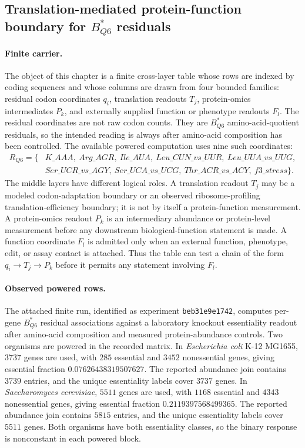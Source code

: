 \subsection{Translation-mediated protein-function boundary for $B^{*}_{Q6}$ residuals}
\label{subsec:q6-translation-mediated-protein-function-boundary-cross-layer}

\paragraph{Finite carrier.}
The object of this chapter is a finite cross-layer table whose rows are indexed by coding sequences and whose columns are drawn from four bounded families: residual codon coordinates $q_i$, translation readouts $T_j$, protein-omics intermediates $P_k$, and externally supplied function or phenotype readouts $F_l$.  The residual coordinates are not raw codon counts.  They are $B^{*}_{Q6}$ amino-acid-quotient residuals, so the intended reading is always after amino-acid composition has been controlled.  The available powered computation uses nine such coordinates:
$$
\begin{aligned}
R_{Q6}=\{&K\_AAA,\ Arg\_AGR,\ Ile\_AUA,\ Leu\_CUN\_vs\_UUR,\ Leu\_UUA\_vs\_UUG,\\
&Ser\_UCR\_vs\_AGY,\ Ser\_UCA\_vs\_UCG,\ Thr\_ACR\_vs\_ACY,\ f3\_stress\}.
\end{aligned}
$$
The middle layers have different logical roles.  A translation readout $T_j$ may be a modeled codon-adaptation boundary or an observed ribosome-profiling translation-efficiency boundary; it is not by itself a protein-function measurement.  A protein-omics readout $P_k$ is an intermediary abundance or protein-level measurement before any downstream biological-function statement is made.  A function coordinate $F_l$ is admitted only when an external function, phenotype, edit, or assay contact is attached.  Thus the table can test a chain of the form $q_i \to T_j \to P_k$ before it permits any statement involving $F_l$.

\paragraph{Observed powered rows.}
The attached finite run, identified as experiment \texttt{beb31e9e1742}, computes per-gene $B^{*}_{Q6}$ residual associations against a laboratory knockout essentiality readout after amino-acid composition and measured protein-abundance controls.  Two organisms are powered in the recorded matrix.  In \emph{Escherichia coli} K-12 MG1655, $3737$ genes are used, with $285$ essential and $3452$ nonessential genes, giving essential fraction $0.07626438319507627$.  The reported abundance join contains $3739$ entries, and the unique essentiality labels cover $3737$ genes.  In \emph{Saccharomyces cerevisiae}, $5511$ genes are used, with $1168$ essential and $4343$ nonessential genes, giving essential fraction $0.2119397568499365$.  The reported abundance join contains $5815$ entries, and the unique essentiality labels cover $5511$ genes.  Both organisms have both essentiality classes, so the binary response is nonconstant in each powered block.


